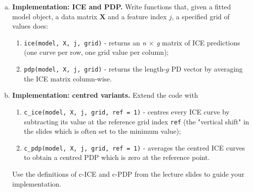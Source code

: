{\begin{enumerate}[a)]
  \item \textbf{Implementation: ICE and PDP.}  
        Write functions that, given a fitted model object, a data matrix \(\mathbf X\) and a feature index \(j\), a specified grid of values does:

        \begin{enumerate}[1.]
          \item \verb|ice(model, X, j, grid)| - returns an \emph{n $\times$ g} matrix of ICE predictions  
                (one curve per row, one grid value per column);
          \item \verb|pdp(model, X, j, grid)| - returns the length-\(g\) PD vector  
                by averaging the ICE matrix column-wise.
        \end{enumerate}

  \item \textbf{Implementation: centred variants.}  
        Extend the code with

        \begin{enumerate}[1.]
          \item \verb|c_ice(model, X, j, grid, ref = 1)| - centres every ICE curve by subtracting its value  
                at the reference grid index \verb|ref| (the "vertical shift" in the slides which is often set to the minimum value);
          \item \verb|c_pdp(model, X, j, grid, ref = 1)| - averages the centred ICE curves to obtain a centred PDP  
                which is zero at the reference point.
        \end{enumerate}

        Use the definitions of c-ICE and c-PDP from the lecture slides to guide your implementation.  

\end{enumerate}
}